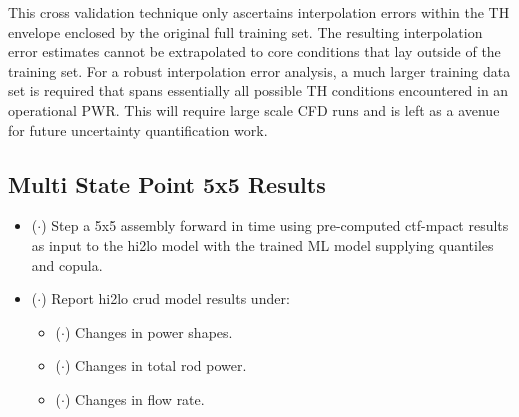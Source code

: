 This cross validation technique only ascertains interpolation errors within the TH envelope enclosed by the original full training set.  The resulting interpolation error estimates cannot be extrapolated to core conditions that lay outside of the training set.  For a robust interpolation error analysis, a much larger training data set is required
that spans essentially all possible TH conditions encountered in an operational PWR.  This will require large scale CFD runs and is left as a avenue for future uncertainty quantification work.

\subsection{Multi State Point 5x5 Results}

\begin{itemize}
	\item ($\cdot$) Step a 5x5 assembly forward in time using pre-computed ctf-mpact results as input to the hi2lo model with the trained ML model supplying quantiles and copula.
	\item ($\cdot$) Report hi2lo crud model results under:
	\begin{itemize}
		\item ($\cdot$) Changes in power shapes.
		\item ($\cdot$) Changes in total rod power.
		\item ($\cdot$) Changes in flow rate.
	\end{itemize}
	
\end{itemize}
